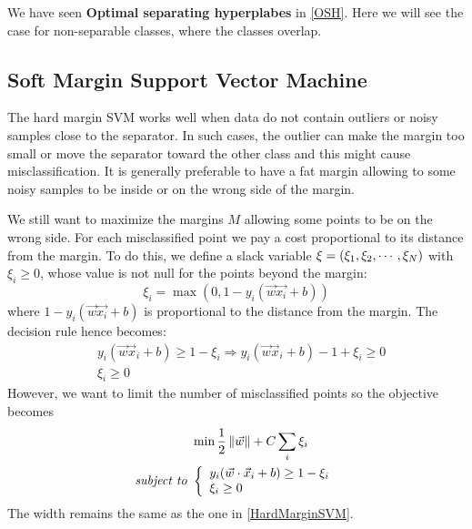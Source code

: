 We have seen \textbf{Optimal separating hyperplabes} in \autoref{OSH}. Here we will see the case for non-separable classes, where the classes overlap.
\subsection{Soft Margin Support Vector Machine}
The hard margin SVM works well when data do not contain outliers or noisy samples close to the separator. In such cases, the outlier can make the margin too small or move the separator toward the other class and this might cause misclassification. It is generally preferable to have a fat margin allowing to some noisy samples to be inside or on the wrong side of the margin.

We still want to maximize the margins $M$ allowing some points to be on the wrong side. For each misclassified point we pay a cost proportional to its distance from the margin. To do this, we define a slack variable $\xi=\left(\xi_1, \xi_2, \cdots, \xi_N\right)$ with $\xi_i\ge 0$, whose value is not null for the points beyond the margin:
\begin{equation}
\xi_i = \max \left(0, 1-y_i(\vec{w}\vec{x_i}+b)\right)
\end{equation}
where $1-y_i(\vec{w}\vec{x_i}+b)$ is proportional to the distance from the margin.	
The decision rule hence becomes:
\begin{equation}
\begin{aligned}
& y_i \left( \vec{w} \vec{x}_i + b\right) \ge 1 - \xi_i \Rightarrow y_i \left( \vec{w} \vec{x}_i + b\right) - 1+ \xi_i  \ge 0 \\
& \xi_i \ge 0
\end{aligned}
\end{equation}
However, we want to limit the number of misclassified points so the objective becomes
\begin{equation}
\begin{aligned}
&\min \frac{1}{2} \left\lVert\vec{w}\right\rVert + C \sum_i \xi_i\\
\textit{subject to }&\left\{
		\begin{array}{ll}
				y_i(\vec{w} \cdot \vec{x}_i+b) \ge 1-\xi_i\\ 
 				\xi_i \ge 0
		\end{array} 
\right.
\end{aligned}
\end{equation}
The width remains the same as the one in \autoref{HardMarginSVM}. 

\iffalse
